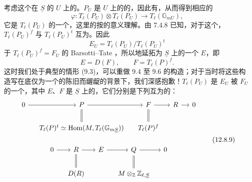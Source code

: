 考虑这个在 $\underline S$ 的 $U$ 上的。$P_U$ 是 $U$ 上的的，因此有，从而得到相应的
\[
 \varphi:T_\ell(P_U)\otimes T_\ell(P_U)\longrightarrow T_\ell(\mathbb G_{mU}),\tag{12.8.7}
\]
它是 $T_\ell(P_U)$ 的一个，这里的按的意义理解。由 7.4.8 已知，对于这个，$T_\ell(P_U)^f$ 与 $T_\ell(P_U)^t$ 互为。因此
\[
 E_U=T_\ell(P_U)/T_\ell(P_U)^t
\]
于 $T_\ell(P_U)^f=F_U$ 的 Barsotti--Tate ，所以地延拓为 $\underline S$ 上的一个 $E$，即
\[
 E=D(F),\qquad F=T_\ell(P)^f.\tag{12.8.8}
\]
这时我们处于典型的情形 (9.3)，可以重做 9.4 至 9.6 的构造；对于当时将这些构造写在底仅为一个的陈旧而龌龊的背景下，我们深感抱歉！$T_\ell(P_U)$ 是 $E_U$ 被 $F_U$ 的一个，其中 $E$、$F$ 是 $\underline S$ 上的，它们分别是下列互为的：
\[
\begin{gathered}
\begin{tikzcd}[column sep=small]
0\arrow[r]&P\arrow[r]\arrow[d,equal]&F\arrow[r]\arrow[d,equal]&R\arrow[r]&0\\
&T_\ell(P)^t\simeq\operatorname{Hom}(M,T_\ell(\mathbb G_{m\underline S}))
&T_\ell(P)^f&&
\end{tikzcd}\\[1em]
\begin{tikzcd}[column sep=small]
0\arrow[r]&R\arrow[r]\arrow[d,equal]&E\arrow[r]&Q\arrow[r]\arrow[d,equal]&0\\
&D(R)&&M\otimes_{\mathbb Z}\mathbb Z_{\ell,\underline S}&
\end{tikzcd}
\end{gathered}\tag{12.8.9}
\]

